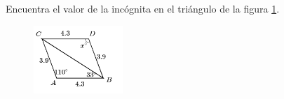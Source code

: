 \question[10]  Encuentra el valor de la incógnita en el triángulo de la figura \ref{fig:angle_triangle_08}.
\begin{figure}[H]
    \begin{center}
        \includegraphics[width=0.3\textwidth]{../images/angle_triangle_08.png}
    \end{center}
    \caption{}
    \label{fig:angle_triangle_08}
\end{figure}